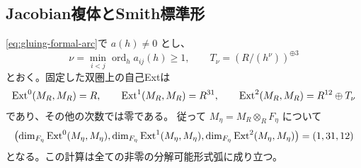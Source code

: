 \subsection{Jacobian複体とSmith標準形}

\begin{theorem}[形式弧上の自己Extとtorsion]\label{thm:gluing-arc-ext}
\eqref{eq:gluing-formal-arc}で $a(h)\ne0$ とし、
\[
 \nu=\min_{i<j}\operatorname{ord}_h a_{ij}(h)\ge1,\qquad
 T_\nu=(R/(h^{\nu}))^{\oplus3}
\]
とおく。固定した双圏上の自己Extは
\begin{equation}\label{eq:gluing-arc-ext}
 \operatorname{Ext}^0(M_R,M_R)=R,\qquad
 \operatorname{Ext}^1(M_R,M_R)=R^{31},\qquad
 \operatorname{Ext}^2(M_R,M_R)=R^{12}\oplus T_\nu
\end{equation}
であり、その他の次数では零である。
従って $M_\eta=M_R\otimes_R F_\eta$ について
\[
 \bigl(\dim_{F_\eta}\operatorname{Ext}^0(M_\eta,M_\eta),
       \dim_{F_\eta}\operatorname{Ext}^1(M_\eta,M_\eta),
       \dim_{F_\eta}\operatorname{Ext}^2(M_\eta,M_\eta)\bigr)=(1,31,12)
\]
となる。この計算は全ての非零の分解可能形式弧に成り立つ。
\end{theorem}

